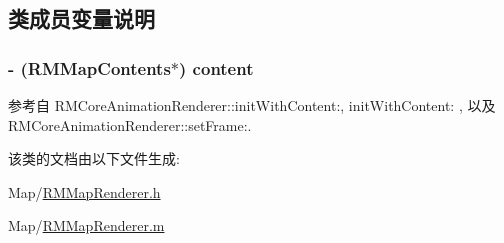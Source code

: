 \subsection{类成员变量说明}
\hypertarget{interface_r_m_map_renderer_a6dc63e478a69b3262bd89acb37ea7bcb}{
\subsubsection[{content}]{\setlength{\rightskip}{0pt plus 5cm}-\/ ({\bf R\-M\-Map\-Contents}$\ast$) content\hspace{0.3cm}{\ttfamily [protected]}}}\label{interface_r_m_map_renderer_a6dc63e478a69b3262bd89acb37ea7bcb}


参考自 R\-M\-Core\-Animation\-Renderer\-::init\-With\-Content\-:, init\-With\-Content\-: , 以及 R\-M\-Core\-Animation\-Renderer\-::set\-Frame\-:.



该类的文档由以下文件生成\-:\begin{DoxyCompactItemize}
\item 
Map/\hyperlink{_r_m_map_renderer_8h}{R\-M\-Map\-Renderer.\-h}\item 
Map/\hyperlink{_r_m_map_renderer_8m}{R\-M\-Map\-Renderer.\-m}\end{DoxyCompactItemize}
